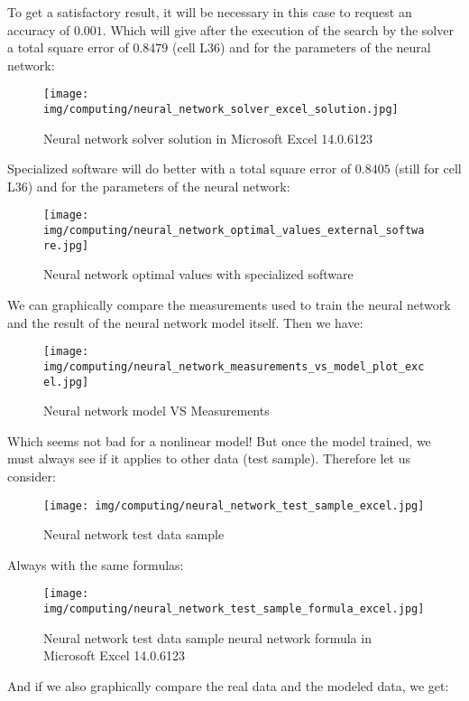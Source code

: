 	\begin{tcolorbox}[colframe=black,colback=white,sharp corners]
	To get a satisfactory result, it will be necessary in this case to request an accuracy of $0.001$. Which will give after the execution of the search by the solver a total square error of $0.8479$ (cell L36) and for the parameters of the neural network:
	\begin{figure}[H]
		\centering
		\texttt{[image: img/computing/neural\_network\_solver\_excel\_solution.jpg]}
		\caption[]{Neural network solver solution in Microsoft Excel 14.0.6123}
	\end{figure}
	Specialized software will do better with a total square error of $0.8405$ (still for cell L36) and for the parameters of the neural network:
	\begin{figure}[H]
		\centering
		\texttt{[image: img/computing/neural\_network\_optimal\_values\_external\_software.jpg]}
		\caption[]{Neural network optimal values with specialized software}
	\end{figure}
	We can graphically compare the measurements used to train the neural network and the result of the neural network model itself. Then we have:
	\end{tcolorbox}
	
	\begin{tcolorbox}[colframe=black,colback=white,sharp corners]
	\begin{figure}[H]
		\centering
		\texttt{[image: img/computing/neural\_network\_measurements\_vs\_model\_plot\_excel.jpg]}
		\caption[]{Neural network model VS Measurements}
	\end{figure}
	Which seems not bad for a nonlinear model! But once the model trained, we must always see if it applies to other data (test sample). Therefore let us consider:
	\begin{figure}[H]
		\centering
		\texttt{[image: img/computing/neural\_network\_test\_sample\_excel.jpg]}
		\caption[]{Neural network test data sample}
	\end{figure}
	Always with the same formulas:
	\begin{figure}[H]
		\centering
		\texttt{[image: img/computing/neural\_network\_test\_sample\_formula\_excel.jpg]}
		\caption[]{Neural network test data sample neural network formula in Microsoft Excel 14.0.6123}
	\end{figure}
	And if we also graphically compare the real data and the modeled data, we get:
	\end{tcolorbox}
	
